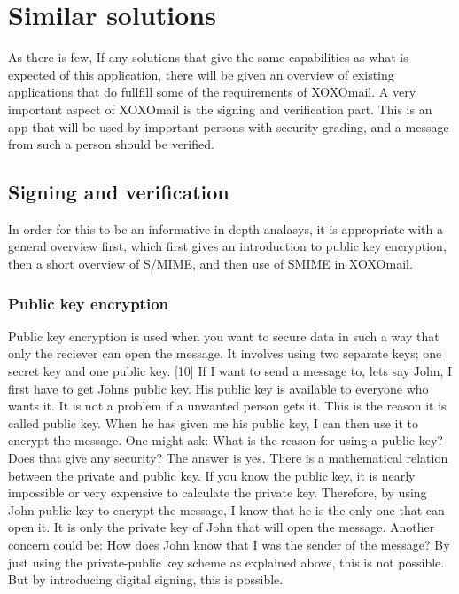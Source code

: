 \section{Similar solutions}
As there is few, If any solutions that give the same capabilities as what is expected of this application, there will be given an overview of existing applications that do fullfill some of the requirements of XOXOmail. 
\newline
\newline
A very important aspect of XOXOmail is the signing and verification part. This is an app that will be used by important persons with security grading, and a message from such a person should be verified. 

\subsection{Signing and verification}
In order for this to be an informative in depth analasys, it is appropriate with a general overview first, which first gives an introduction to public key encryption, then a short overview of S/MIME, and then use of SMIME in XOXOmail.

\subsubsection{Public key encryption}
Public key encryption is used when you want to secure data in such a way that only the reciever can open the message. It involves using two separate keys; one secret key and one public key. [10]
\newline
\newline
If I want to send a message to, lets say John, I first have to get Johns public key. His public key is available to everyone who wants it. It is not a problem if a unwanted person gets it. This is the reason it is called public key. When he has given me his public key, I can then use it to encrypt the message. One might ask: What is the reason for using a public key? Does that give any security? The answer is yes. There is a mathematical relation between the private and public key. If you know the public key, it is nearly impossible or very expensive to calculate the private key. Therefore, by using John public key to encrypt the message, I know that he is the only one that can open it. It is only the private key of John that will open the message. 
\newline
\newline
Another concern could be: How does John know that I was the sender of the message? By just using the private-public key scheme as explained above, this is not possible. But by introducing digital signing, this is possible.

